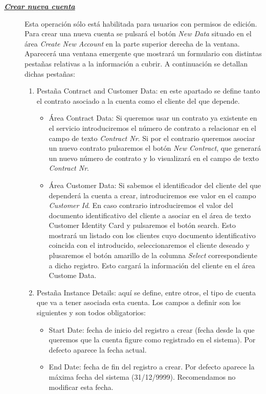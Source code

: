 \begin{description}
\item[\underline{\textsl{\textbf{Crear nueva cuenta}}}] Esta operación sólo está habilitada para usuarios con permisos de edición.
Para crear una nueva cuenta se pulsará el botón \textit{New Data} situado en el área \emph{Create New Account} en la parte superior derecha de la ventana. Aparecerá una ventana emergente que mostrará un formulario con distintas pestañas relativas a la información a cubrir. A continuación se detallan dichas pestañas:
\begin{enumerate}
\item Pestaña Contract and Customer Data: en este apartado se define tanto el contrato asociado a la cuenta como el cliente del que depende. 
	\begin{itemize}
		\item Área Contract Data: Si queremos usar un contrato ya existente en el servicio introduciremos el número de contrato a relacionar en el campo de texto \emph{Contract Nr}. Si por el contrario queremos asociar un nuevo contrato pulsaremos el botón \emph{New Contract}, que generará un nuevo número de contrato y lo visualizará en el campo de texto \emph{Contract Nr}.
		\item Área Customer Data: Si sabemos el identificador del cliente del que dependerá la cuenta a crear, introduciremos ese valor en el campo \emph{Customer Id}. En caso contrario introduciremos el valor del documento identificativo del cliente a asociar en el área de texto Customer Identity Card y pulsaremos el botón search. Esto mostrará un listado con los clientes cuyo documento identificativo coincida con el introducido, seleccionaremos el cliente deseado y plusaremos el botón amarillo de la columna \emph{Select} correspondiente a dicho registro. Esto cargará la información del cliente en el área Custome Data.		
	\end{itemize}		
\item Pestaña Instance Details: aquí se define, entre otros, el tipo de cuenta que va a tener asociada esta cuenta. Los campos a definir son los siguientes y son todos obligatorios:
	\begin{itemize}
	\item Start Date: fecha de inicio del registro a crear (fecha desde la que queremos que la cuenta figure como registrado en el sistema). Por defecto aparece la fecha actual.
	\item End Date: fecha de fin del registro a crear. Por defecto aparece la máxima fecha del sistema (31/12/9999). Recomendamos no modificar esta fecha.

\end{itemize}
\end{enumerate}
\end{description}
